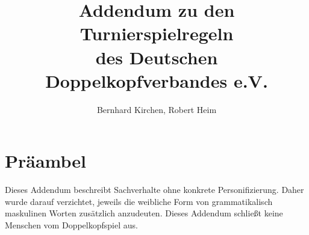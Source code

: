 \documentclass[12pt]{article}
\begin{document}
\title{Addendum zu den Turnierspielregeln\\des Deutschen Doppelkopfverbandes e.V.}
\author{Bernhard Kirchen, Robert Heim}

\maketitle

\section*{Präambel}
Dieses Addendum beschreibt Sachverhalte ohne konkrete Personifizierung. Daher wurde
darauf verzichtet, jeweils die weibliche Form von grammatikalisch maskulinen Worten
zusätzlich anzudeuten. Dieses Addendum schließt keine Menschen vom Doppelkopfspiel
aus.


\end{document}
